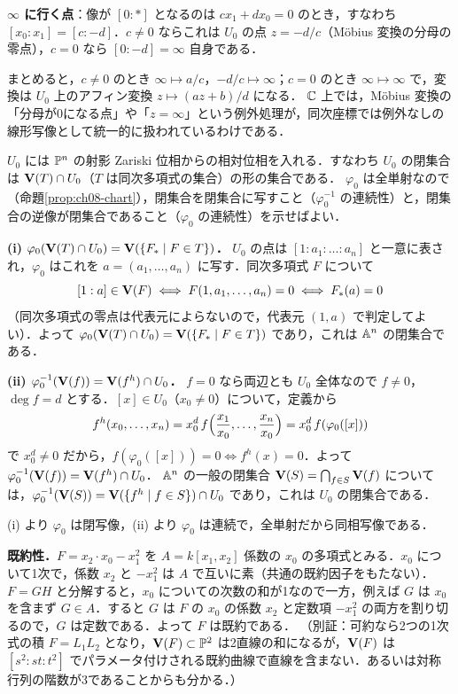 \textbf{$\infty$ に行く点}：像が $[0:\ast]$ となるのは $cx_1+dx_0=0$ のとき，すなわち $[x_0:x_1]=[c:-d]$．$c\neq0$ ならこれは $U_0$ の点 $z=-d/c$（Möbius 変換の分母の零点），$c=0$ なら $[0:-d]=\infty$ 自身である．

まとめると，$c\neq0$ のとき $\infty\mapsto a/c$，$-d/c\mapsto\infty$；$c=0$ のとき $\infty\mapsto\infty$ で，変換は $U_0$ 上のアフィン変換 $z\mapsto(az+b)/d$ になる．
$\mathbb{C}$ 上では，Möbius 変換の「分母が0になる点」や「$z=\infty$」という例外処理が，同次座標では例外なしの線形写像として統一的に扱われているわけである．

$U_0$ には $\mathbb{P}^n$ の射影 Zariski 位相からの相対位相を入れる．すなわち $U_0$ の閉集合は $\mathbf{V}(T)\cap U_0$（$T$ は同次多項式の集合）の形の集合である．
$\varphi_0$ は全単射なので（命題\ref{prop:ch08-chart}），閉集合を閉集合に写すこと（$\varphi_0^{-1}$ の連続性）と，閉集合の逆像が閉集合であること（$\varphi_0$ の連続性）を示せばよい．

\textbf{(i) $\varphi_0(\mathbf{V}(T)\cap U_0)=\mathbf{V}(\{F_*\mid F\in T\})$．}
$U_0$ の点は $[1:a_1:\dots:a_n]$ と一意に表され，$\varphi_0$ はこれを $a=(a_1,\dots,a_n)$ に写す．同次多項式 $F$ について
\[
  [1:a]\in\mathbf{V}(F)\iff F(1,a_1,\dots,a_n)=0\iff F_*(a)=0
\]
（同次多項式の零点は代表元によらないので，代表元 $(1,a)$ で判定してよい）．よって $\varphi_0(\mathbf{V}(T)\cap U_0)=\mathbf{V}(\{F_*\mid F\in T\})$ であり，これは $\mathbb{A}^n$ の閉集合である．

\textbf{(ii) $\varphi_0^{-1}(\mathbf{V}(f))=\mathbf{V}(f^h)\cap U_0$．}
$f=0$ なら両辺とも $U_0$ 全体なので $f\neq0$，$\deg f=d$ とする．$[x]\in U_0$（$x_0\neq0$）について，定義から
\[
  f^h(x_0,\dots,x_n)=x_0^d\,f\Bigl(\frac{x_1}{x_0},\dots,\frac{x_n}{x_0}\Bigr)=x_0^d\,f(\varphi_0([x]))
\]
で $x_0^d\neq0$ だから，$f(\varphi_0([x]))=0\iff f^h(x)=0$．よって $\varphi_0^{-1}(\mathbf{V}(f))=\mathbf{V}(f^h)\cap U_0$．
$\mathbb{A}^n$ の一般の閉集合 $\mathbf{V}(S)=\bigcap_{f\in S}\mathbf{V}(f)$ については，$\varphi_0^{-1}(\mathbf{V}(S))=\mathbf{V}(\{f^h\mid f\in S\})\cap U_0$ であり，これは $U_0$ の閉集合である．

(i) より $\varphi_0$ は閉写像，(ii) より $\varphi_0$ は連続で，全単射だから同相写像である．

\textbf{既約性．}$F=x_2\cdot x_0-x_1^2$ を $A=k[x_1,x_2]$ 係数の $x_0$ の多項式とみる．$x_0$ について1次で，係数 $x_2$ と $-x_1^2$ は $A$ で互いに素（共通の既約因子をもたない）．
$F=GH$ と分解すると，$x_0$ についての次数の和が1なので一方，例えば $G$ は $x_0$ を含まず $G\in A$．すると $G$ は $F$ の $x_0$ の係数 $x_2$ と定数項 $-x_1^2$ の両方を割り切るので，$G$ は定数である．よって $F$ は既約である．
（別証：可約なら2つの1次式の積 $F=L_1L_2$ となり，$\mathbf{V}(F)\subset\mathbb{P}^2$ は2直線の和になるが，$\mathbf{V}(F)$ は $[s^2:st:t^2]$ でパラメータ付けされる既約曲線で直線を含まない．あるいは対称行列の階数が3であることからも分かる．）

